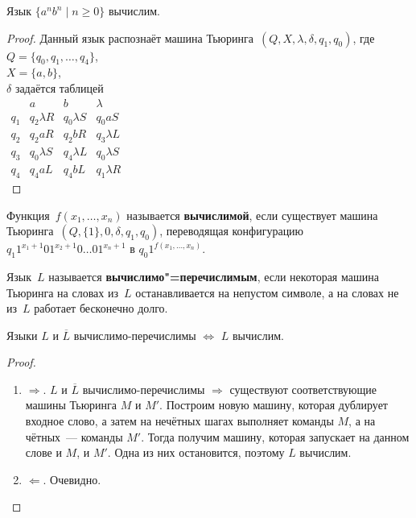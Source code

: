 \begin{statement}
Язык $\{ a^n b^n \mid n \geqslant 0 \}$ вычислим.
\end{statement}
\begin{proof}
Данный язык распознаёт машина Тьюринга~$(Q, X, \lambda, \delta, q_1, q_0)$, где\\
$Q = \{ q_0, q_1, \ldots, q_4 \}$,\\
$X = \{ a, b \}$,\\
$\delta$ задаётся таблицей\\
$\begin{array}{c|c|c|c}
  & a & b & \lambda \\
\hline
q_1 & q_2 \lambda R & q_0 \lambda S & q_0 a S \\
q_2 & q_2 a R & q_2 b R & q_3 \lambda L \\
q_3 & q_0 \lambda S & q_4 \lambda L & q_0 \lambda S \\
q_4 & q_4 a L & q_4 b L & q_1 \lambda R
\end{array}$\\
\end{proof}

 Функция~$f(x_1, \ldots, x_n)$ называется \textbf{вычислимой}, если существует машина Тьюринга~$(Q, \{ 1 \}, 0, \delta, q_1, q_0)$, переводящая конфигурацию~$q_1 1^{x_1 + 1} 0 1^{x_2 + 1} 0 \ldots 0 1^{x_n + 1}$ в $q_0 1^{f(x_1, \ldots, x_n)}$.

 Язык~$L$ называется \textbf{вычислимо"=перечислимым}, если некоторая машина Тьюринга на словах из~$L$ останавливается на непустом символе, а на словах не из~$L$ работает бесконечно долго.

\begin{statement}
Языки $L$ и $\overline L$ вычислимо-перечислимы $\Leftrightarrow$ $L$ вычислим.
\end{statement}
\begin{proof}
\begin{enumerate}
	\item $\Rightarrow$.
	$L$ и $\overline L$ вычислимо-перечислимы $\Rightarrow$ существуют соответствующие машины Тьюринга $M$ и $M'$.
	Построим новую машину, которая дублирует входное слово, а затем на нечётных шагах выполняет команды $M$, а на чётных~--- команды $M'$.
	Тогда получим машину, которая запускает на данном слове и $M$, и $M'$.
	Одна из них остановится, поэтому $L$ вычислим.
	
	\item $\Leftarrow$. Очевидно.
\end{enumerate}
\end{proof}

